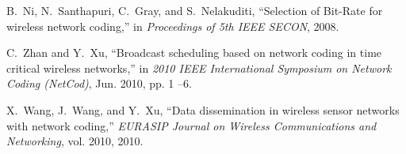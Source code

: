 \documentclass[journal]{IEEEtran}
\begin{document}
\begin{thebibliography}{10}
B.~Ni, N.~Santhapuri, C.~Gray, and S.~Nelakuditi, ``Selection of {Bit-Rate} for
  wireless network coding,'' in \emph{Proceedings of 5th {IEEE} SECON}, 2008.

C.~Zhan and Y.~Xu, ``Broadcast scheduling based on network coding in time
  critical wireless networks,'' in \emph{2010 {IEEE} International Symposium on
  Network Coding {(NetCod)}}, Jun. 2010, pp. 1 --6.

X.~Wang, J.~Wang, and Y.~Xu, ``Data dissemination in wireless sensor networks
  with network coding,'' \emph{EURASIP Journal on Wireless Communications and
  Networking}, vol. 2010, 2010.

\end{thebibliography}
\end{document}
